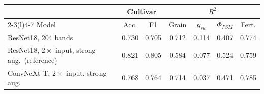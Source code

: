 \begin{tabular}{@{}lcccccc@{}}
\toprule
 & \multicolumn{2}{c}{Cultivar} & \multicolumn{4}{c}{$R^2$} \\
\cmidrule(lr){2-3}\cmidrule(l){4-7}
Model & Acc. & F1 & Grain & $g_{sw}$ & $\Phi_{PSII}$ & Fert. \\
\midrule
ResNet18, 204 bands & 0.730 & 0.705 & 0.712 & 0.114 & 0.407 & 0.774 \\
ResNet18, $2\times$ input, strong aug.\ (reference) & 0.821 & 0.805 & 0.584 & 0.077 & 0.524 & 0.759 \\
ConvNeXt-T, $2\times$ input, strong aug. & 0.768 & 0.764 & 0.714 & 0.037 & 0.471 & 0.785 \\
\bottomrule
\end{tabular}
